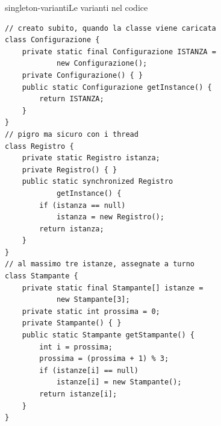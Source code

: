 \begin{caso}{singleton-varianti}{Le varianti nel codice}
\begin{lstlisting}[style=javacs]
// creato subito, quando la classe viene caricata
class Configurazione {
    private static final Configurazione ISTANZA =
            new Configurazione();
    private Configurazione() { }
    public static Configurazione getInstance() {
        return ISTANZA;
    }
}
// pigro ma sicuro con i thread
class Registro {
    private static Registro istanza;
    private Registro() { }
    public static synchronized Registro
            getInstance() {
        if (istanza == null)
            istanza = new Registro();
        return istanza;
    }
}
// al massimo tre istanze, assegnate a turno
class Stampante {
    private static final Stampante[] istanze =
            new Stampante[3];
    private static int prossima = 0;
    private Stampante() { }
    public static Stampante getStampante() {
        int i = prossima;
        prossima = (prossima + 1) % 3;
        if (istanze[i] == null)
            istanze[i] = new Stampante();
        return istanze[i];
    }
}
\end{lstlisting}
\tcblower
{}
\end{caso}
